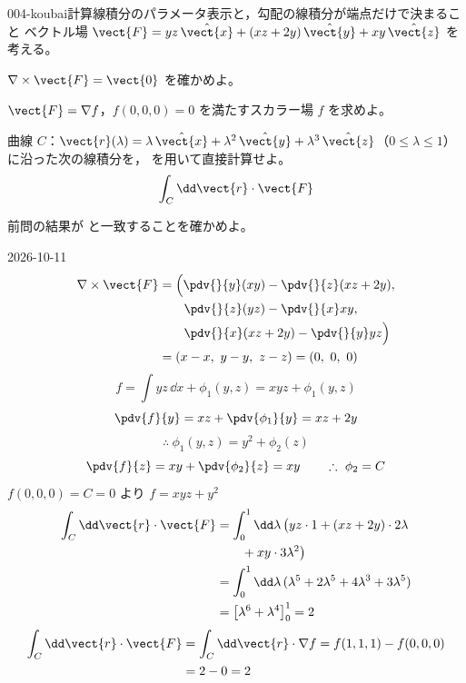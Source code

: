 \documentclass[uplatex,dvipdfmx,a4paper,11pt]{jsarticle}
\begin{document}
\mondaihen
{}
\begin{mondai}{004-koubai}{計算}{線積分のパラメータ表示と，勾配の線積分が端点だけで決まること}
ベクトル場 $\vect{F} = yz\,\hat{\vect{x}} + (xz + 2y)\,\hat{\vect{y}} + xy\,\hat{\vect{z}}$ を考える。
  \begin{shoumon}
    \item $\nabla\times\vect{F} = \vect{0}$ を確かめよ。
    \item $\vect{F} = \nabla f$，$f(0,0,0) = 0$ を満たすスカラー場 $f$ を求めよ。
    \item 曲線 $C$：$\vect{r}(\lambda) = \lambda\,\hat{\vect{x}} + \lambda^2\,\hat{\vect{y}} + \lambda^3\,\hat{\vect{z}}$（$0 \le \lambda \le 1$）に沿った次の線積分を， を用いて直接計算せよ。
    \[ \int_C \dd\vect{r}\cdot\vect{F} \]
    \item 前問の結果が  と一致することを確かめよ。
  \end{shoumon}
\begin{kotaeutsushi}{2026-10-11}
\begin{align*}
\nabla\times\vect{F}&=\Bigl(\pdv{}{y}(xy)-\pdv{}{z}(xz+2y),\\
&\qquad\pdv{}{z}(yz)-\pdv{}{x}xy,\\
&\qquad\pdv{}{x}(xz+2y)-\pdv{}{y}yz\Bigr)\\
&=(x-x,\ y-y,\ z-z)=(0,\ 0,\ 0)
\end{align*}
\[ f=\int yz\,\dd x+\phi_{1}(y,z)=xyz+\phi_{1}(y,z) \]
\[ \pdv{f}{y}=xz+\pdv{\phi_{1}}{y}=xz+2y \]
\[ \therefore\ \phi_{1}(y,z)=y^{2}+\phi_{2}(z) \]
\[ \pdv{f}{z}=xy+\pdv{\phi_{2}}{z}=xy\qquad\therefore\ \phi_{2}=C \]
$f(0,0,0)=C=0$ より $f=xyz+y^{2}$
\begin{align*}
\int_{C}\dd\vect{r}\cdot\vect{F}&=\int_{0}^{1}\dd\lambda\,\bigl(yz\cdot1+(xz+2y)\cdot2\lambda\\
&\qquad+xy\cdot3\lambda^{2}\bigr)\\
&=\int_{0}^{1}\dd\lambda\,(\lambda^{5}+2\lambda^{5}+4\lambda^{3}+3\lambda^{5})\\
&=\bigl[\lambda^{6}+\lambda^{4}\bigr]_{0}^{1}=2
\end{align*}
\begin{align*}
\int_{C}\dd\vect{r}\cdot\vect{F}&=\int_{C}\dd\vect{r}\cdot\nabla f=f(1,1,1)-f(0,0,0)\\
&=2-0=2
\end{align*}
\end{kotaeutsushi}
\end{mondai}
\end{document}

